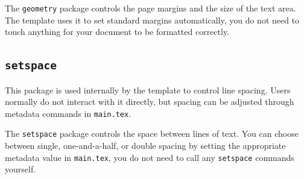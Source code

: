 The \texttt{geometry} package controls the page margins and the size of the text area. The template uses it to set standard margins automatically, you do not need to touch anything for your document to be formatted correctly.

\subsection{\texttt{setspace}}
\noindent\colorbox{themecolour!15}{\parbox{\linewidth}{\small This package is used internally by the template to control line spacing. Users normally do not interact with it directly, but spacing can be adjusted through metadata commands in \texttt{main.tex}.}}\vspace{0.5\baselineskip}

The \texttt{setspace} package controls the space between lines of text. You can choose between single, one-and-a-half, or double spacing by setting the appropriate metadata value in \texttt{main.tex}, you do not need to call any \texttt{setspace} commands yourself.

